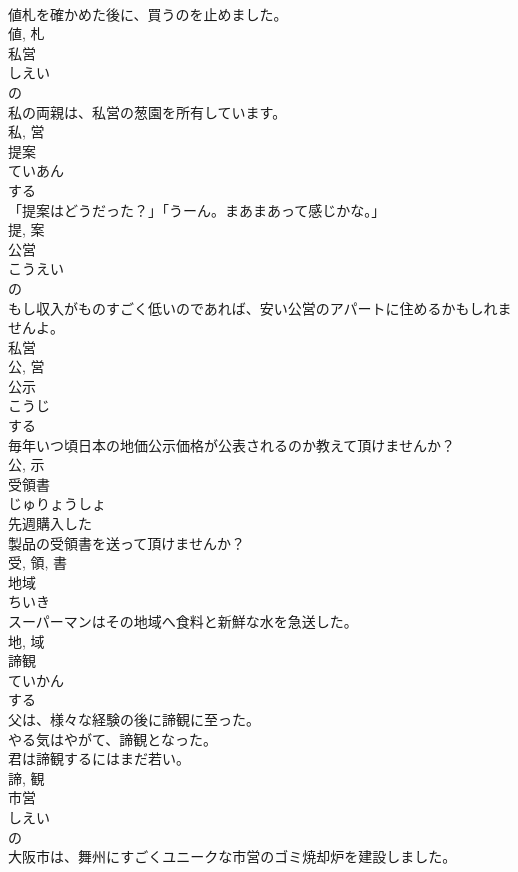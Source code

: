 \documentclass[8pt]{extreport}
\begin{document}
\begin{CJK}{UTF8}{min}
\\	値札を確かめた後に、買うのを止めました。	
\\	値, 札	
\\	私営	
\\	しえい	
\\	の 
\\	私の両親は、私営の葱園を所有しています。	
\\	私, 営	
\\	提案	
\\	ていあん	
\\	する 
\\	「提案はどうだった？」「うーん。まあまあって感じかな。」	
\\	提, 案	
\\	公営	
\\	こうえい	
\\	の 
\\	もし収入がものすごく低いのであれば、安い公営のアパートに住めるかもしれませんよ。	
\\	私営 
\\	公, 営	
\\	公示	
\\	こうじ	
\\	する 
\\	毎年いつ頃日本の地価公示価格が公表されるのか教えて頂けませんか？	
\\	公, 示	
\\	受領書	
\\	じゅりょうしょ	
\\	先週購入した
\\	製品の受領書を送って頂けませんか？	
\\	受, 領, 書	
\\	地域	
\\	ちいき	
\\	スーパーマンはその地域へ食料と新鮮な水を急送した。	
\\	地, 域	
\\	諦観	
\\	ていかん	
\\	する 
\\	父は、様々な経験の後に諦観に至った。	
\\	やる気はやがて、諦観となった。	
\\	君は諦観するにはまだ若い。	
\\	諦, 観	
\\	市営	
\\	しえい	
\\	の 
\\	大阪市は、舞州にすごくユニークな市営のゴミ焼却炉を建設しました。	

\end{CJK}
\end{document}
